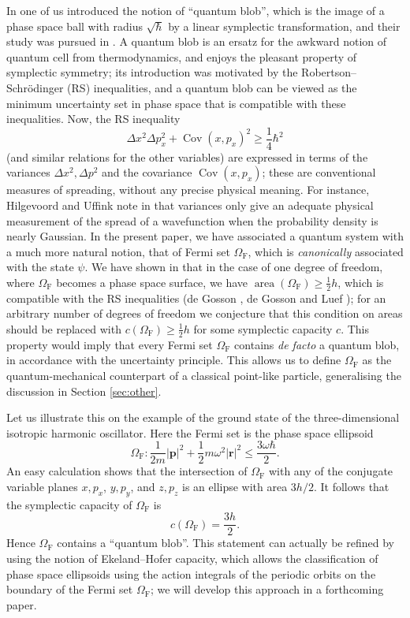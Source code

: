 \documentclass[11pt]{article}%
\begin{document}
In \cite{de03-2} one of us introduced the notion of \textquotedblleft quantum
blob\textquotedblright, which is the image of a phase space ball with radius
$\sqrt{\hbar}$ by a linear symplectic transformation, and their study was
pursued in \cite{Birk,blobs}. A quantum blob is an ersatz for the awkward
notion of quantum cell from thermodynamics, and enjoys the pleasant property
of symplectic symmetry; its introduction was motivated by the
Robertson--Schr\"{o}dinger (RS) inequalities, and a quantum blob can be viewed
as the minimum uncertainty set in phase space that is compatible with these
inequalities. Now, the RS inequality
\[
\Delta x^{2}\Delta p_{x}^{2}+\operatorname*{Cov}(x,p_{x})^{2}\geq\frac{1}%
{4}\hbar^{2}%
\]
(and similar relations for the other variables) are expressed in terms of the
variances $\Delta x^{2},\Delta p^{2}$ and the covariance $\operatorname*{Cov}%
(x,p_{x})$; these are conventional measures of spreading, without any precise
physical meaning. For instance, Hilgevoord and Uffink note in
\cite{hi02,hiuf85bis} that variances only give an adequate physical
measurement of the spread of a wavefunction when the probability density is
nearly Gaussian. In the present paper, we have associated a quantum system
with a much more natural notion, that of Fermi set $\Omega_{\mathrm{F}}$,
which is \emph{canonically} associated with the state $\psi$. We have shown in
\cite{degohi14} that in the case of one degree of freedom, where
$\Omega_{\mathrm{F}}$ becomes a phase space surface, we have
$\operatorname*{area}(\Omega_{\mathrm{F}})\geq\frac{1}{2}h$, which is
compatible with the RS inequalities (de Gosson \cite{de02-2,de03-2,go09}, de
Gosson and Luef \cite{golu10}); for an arbitrary number of degrees of freedom
we conjecture that this condition on areas should be replaced with
$c(\Omega_{\mathrm{F}})\geq\frac{1}{2}h$ for some symplectic capacity $c$.
This property would imply that every Fermi set $\Omega_{\mathrm{F}}$ contains
\textit{de facto} \cite{blobs,golu10} a quantum blob, in accordance with the
uncertainty principle. This allows us to define $\Omega_{\mathrm{F}}$ as the
quantum-mechanical counterpart of a classical point-like particle,
generalising the discussion in Section \ref{sec:other}.

Let us illustrate this on the example of the ground state of the
three-dimensional isotropic harmonic oscillator. Here the Fermi set is the
phase space ellipsoid%
\[
\Omega_{\mathrm{F}}:\frac{1}{2m}|\mathbf{p}|^{2}+\frac{1}{2}m\omega
^{2}|\mathbf{r}|^{2}\leq\frac{3\omega\hbar}{2}.
\]
An easy calculation shows that the intersection of $\Omega_{\mathrm{F}}$ with
any of the conjugate variable planes $x,p_{x}$, $y,p_{y}$, and $z,p_{z}$ is an
ellipse with area $3h/2$. It follows \cite{eggs} that the symplectic capacity
of $\Omega_{\mathrm{F}}$ is
\[
c(\Omega_{\mathrm{F}})=\frac{3h}{2}.
\]
Hence $\Omega_{\mathrm{F}}$ contains a \textquotedblleft quantum
blob\textquotedblright. This statement can actually be refined by using the
notion of Ekeland--Hofer capacity, which allows the classification of phase
space ellipsoids using the action integrals of the periodic orbits on the
boundary of the Fermi set $\Omega_{\mathrm{F}}$; we will develop this approach
in a forthcoming paper.
\end{document}
